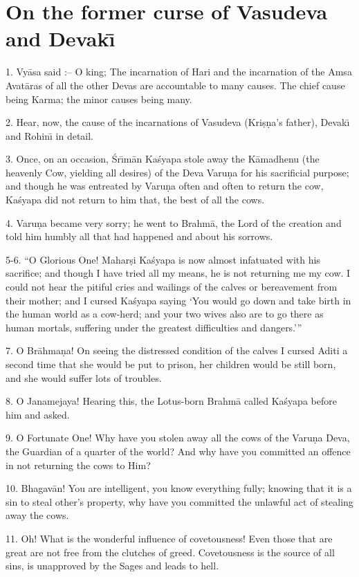 \chapter{On the former curse of Vasudeva and Devak\={\i}}

1. Vy\=asa said :-- O king; The incarnation of Hari and the incarnation of the Amsa Avat\=aras of all the other Devas are accountable to many causes. The chief cause being Karma; the minor causes being many.

2. Hear, now, the cause of the incarnations of Vasudeva (Kri\d{s}\d{n}a's father), Devak\={\i} and Rohin\={\i} in detail.

3. Once, on an occasion, \'Sr\={\i}m\=an Ka\'syapa stole away the K\=amadhenu (the heavenly Cow, yielding all desires) of the Deva Varu\d{n}a for his sacrificial purpose; and though he was entreated by Varu\d{n}a often and often to return the cow, Ka\'syapa did not return to him that, the best of all the cows.

4. Varu\d{n}a became very sorry; he went to Brahm\=a, the Lord of the creation and told him humbly all that had happened and about his sorrows.

5-6. ``O Glorious One! Mahar\d{s}i Ka\'syapa is now almost infatuated with his sacrifice; and though I have tried all my means, he is not returning me my cow. I could not hear the pitiful cries and wailings of the calves or bereavement from their mother; and I cursed Ka\'syapa saying `You would go down and take birth in the human world as a cow-herd; and your two wives also are to go there as human mortals, suffering under the greatest difficulties and dangers.'''

7. O Br\=ahma\d{n}a! On seeing the distressed condition of the calves I cursed Aditi a second time that she would be put to prison, her children would be still born, and she would suffer lots of troubles.

8. O Janamejaya! Hearing this, the Lotus-born Brahm\=a called Ka\'syapa before him and asked.

9. O Fortunate One! Why have you stolen away all the cows of the Varu\d{n}a Deva, the Guardian of a quarter of the world? And why have you committed an offence in not returning the cows to Him?

10. Bhagav\=an! You are intelligent, you know everything fully; knowing that it is a sin to steal other's property, why have you committed the unlawful act of stealing away the cows.

11. Oh! What is the wonderful influence of covetousness! Even those that are great are not free from the clutches of greed. Covetousness is the source of all sins, is unapproved by the Sages and leads to hell.

